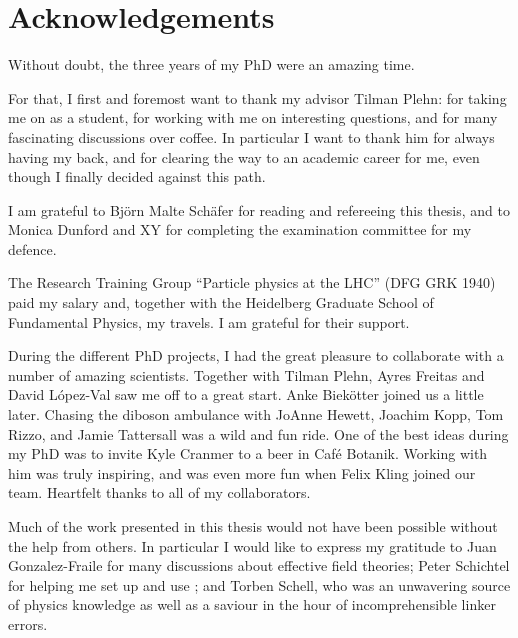

\chapter*{Acknowledgements}

Without doubt, the three years of my PhD were an amazing time.

For that, I first and foremost want to thank my advisor Tilman Plehn:
for taking me on as a student, for working with me on interesting
questions, and for many fascinating discussions over coffee. In
particular I want to thank him for always having my back, and for
clearing the way to an academic career for me, even though I finally
decided against this path.

I am grateful to Bj\"orn Malte Sch\"afer for reading and refereeing
this thesis, and to Monica Dunford and XY for completing the
examination committee for my defence.

The Research Training Group ``Particle physics at the LHC'' (DFG GRK
1940) paid my salary and, together with the Heidelberg Graduate School
of Fundamental Physics, my travels. I am grateful for their support.

During the different PhD projects, I had the great pleasure to
collaborate with a number of amazing scientists. Together with Tilman
Plehn, Ayres Freitas and David L\'opez-Val saw me off to a great
start. Anke Biek\"otter joined us a little later. Chasing the diboson
ambulance with JoAnne Hewett, Joachim Kopp, Tom Rizzo, and Jamie
Tattersall was a wild and fun ride. One of the best ideas during my
PhD was to invite Kyle Cranmer to a beer in Caf\'e Botanik. Working
with him was truly inspiring, and was even more fun when Felix Kling
joined our team.  Heartfelt thanks to all of my collaborators.

Much of the work presented in this thesis would not have been possible
without the help from others. In particular I would like to express my
gratitude to Juan Gonzalez-Fraile for many discussions about effective
field theories; Peter Schichtel for helping me set up and use
; and Torben Schell, who was an unwavering source of
physics knowledge as well as a saviour in the hour of incomprehensible
linker errors.

